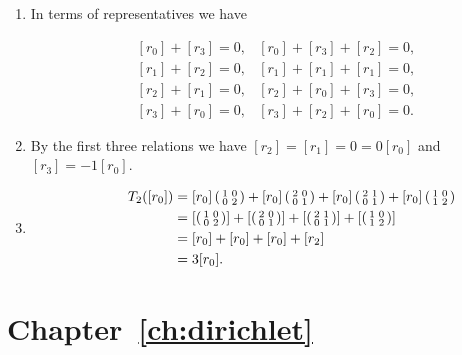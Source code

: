\begin{enumerate}
\begin{enumerate}
\item 
In terms of representatives we have 
%

%
$$
\begin{array}{ccc}
& [r_0]+[r_3]=0, & [r_0]+[r_3]+[r_2]=0, \\
& [r_1]+[r_2]=0, & [r_1]+[r_1]+[r_1]=0, \\
& [r_2]+[r_1]=0, & [r_2]+[r_0]+[r_3]=0, \\
& [r_3]+[r_0]=0, & [r_3]+[r_2]+[r_0]=0.
\end{array}
$$

\item By the first three relations we have $[r_2] = [r_1] = 0 = 0[r_0]$ and $[r_3] = -1[r_0]$. 

\item \begin{align*}
\qquad\quad T_2([r_0]) & =  
[r_0] \left( \begin{smallmatrix}1&0\\0&2\end{smallmatrix}\right)
+ [r_0]\left( \begin{smallmatrix}2 & 0 \\ 0 & 1\end{smallmatrix}\right)
+ [r_0]\left( \begin{smallmatrix}2 & 1 \\ 0 & 1\end{smallmatrix}\right)
+ [r_0]\left( \begin{smallmatrix}1 & 0 \\ 1 & 2\end{smallmatrix}\right) \\
& = 
\left[ \left( \begin{smallmatrix}1 & 0 \\ 0 & 2\end{smallmatrix}\right) \right]
+ \left[ \left( \begin{smallmatrix}2 & 0 \\ 0 & 1\end{smallmatrix}\right) \right]
+ \left[ \left( \begin{smallmatrix}2 & 1 \\ 0 & 1\end{smallmatrix}\right) \right]
+ \left[ \left( \begin{smallmatrix}1 & 0 \\ 1 & 2\end{smallmatrix}\right) \right] \\
& =  [r_0] + [r_0] + [r_0] + [r_2] \\
& =  3[r_0].
\end{align*}

\end{enumerate}


\end{enumerate}

\section{Chapter~\ref{ch:dirichlet}}

